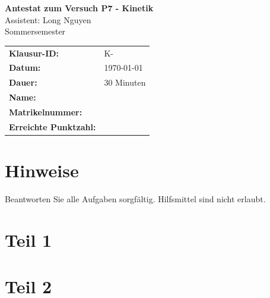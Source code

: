 \documentclass[a4paper,12pt]{article}
\newcommand{\klausurID}{K-\randomid}
\begin{document}
\pagestyle{fancy}
\fancyhead[R]{\textbf{\klausurID}}


\begin{center}
  {\LARGE\bfseries Antestat zum Versuch P7 - Kinetik}\\[1ex]
  {\large Assistent: Long Nguyen}\\[1ex]
    {\large Sommersemester \the \year}
\end{center}

\begin{examheaderbox}
\begin{tabular}{p{5cm}p{8cm}}
\textbf{Klausur-ID:} & \klausurID \\
\textbf{Datum:} & \today \\
\textbf{Dauer:} & 30 Minuten \\
\textbf{Name:} & \hrulefill \\
\textbf{Matrikelnummer:} & \hrulefill \\
\textbf{Erreichte Punktzahl:} & \hrulefill \\
\end{tabular}
\end{examheaderbox}

\section*{Hinweise}
Beantworten Sie alle Aufgaben sorgfältig. Hilfsmittel sind nicht erlaubt.\\




\section{Teil 1}


\section{Teil 2}


\printsolutions[Punkt=0.5]
\printsolutions[Punkt=1]
\end{document}
